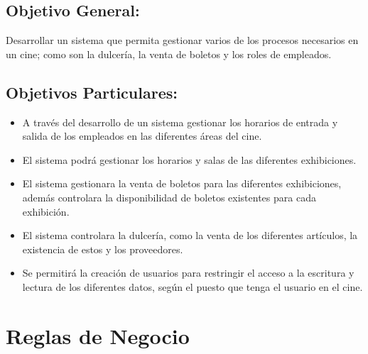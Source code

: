 \documentclass[11pt, fleqn]{article}                             %
\begin{document}
\clearpage

    \subsection{Objetivo General:}

        Desarrollar un sistema que permita gestionar varios de los procesos necesarios en un cine;
        como son la dulcería, la venta de boletos y los roles de empleados.


    \subsection{Objetivos Particulares:}
    
        \begin{itemize}
            \item A través del desarrollo de un sistema gestionar los horarios de entrada y
                salida de los empleados en las diferentes áreas del cine.
            
            \item El sistema podrá gestionar los horarios y salas de las diferentes exhibiciones.

            \item El sistema gestionara la venta de boletos para las diferentes exhibiciones,
                además controlara la disponibilidad de boletos existentes para cada exhibición.

            \item El sistema controlara la dulcería, como la venta de los diferentes artículos,
                la existencia de estos y los proveedores.

            \item Se permitirá la creación de usuarios para restringir el acceso a la escritura y
                lectura de los diferentes datos, según el puesto que tenga el usuario en el cine.

        \end{itemize}


\section{Reglas de Negocio}
\end{document}
